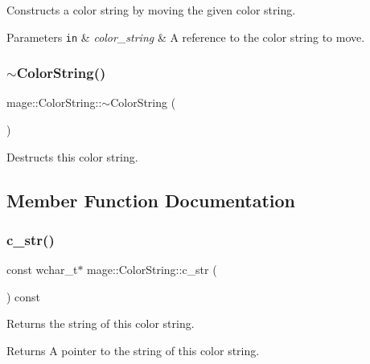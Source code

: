 Constructs a color string by moving the given color string.


\begin{DoxyParams}[1]{Parameters}
\mbox{\tt in}  & {\em color\+\_\+string} & A reference to the color string to move. \\
\hline
\end{DoxyParams}
\hypertarget{structmage_1_1_color_string_a95886010269c8c4bc3a27fbfe829f4c2}{}\label{structmage_1_1_color_string_a95886010269c8c4bc3a27fbfe829f4c2} 
\subsubsection{\texorpdfstring{$\sim$\+Color\+String()}{~ColorString()}}
{\footnotesize\ttfamily mage\+::\+Color\+String\+::$\sim$\+Color\+String (\begin{DoxyParamCaption}{ }\end{DoxyParamCaption})\hspace{0.3cm}{\ttfamily [default]}}

Destructs this color string. 

\subsection{Member Function Documentation}
\hypertarget{structmage_1_1_color_string_af2241b81cac59051e9ebf0ddefe719ed}{}\label{structmage_1_1_color_string_af2241b81cac59051e9ebf0ddefe719ed} 
\subsubsection{\texorpdfstring{c\+\_\+str()}{c\_str()}}
{\footnotesize\ttfamily const wchar\+\_\+t$\ast$ mage\+::\+Color\+String\+::c\+\_\+str (\begin{DoxyParamCaption}{ }\end{DoxyParamCaption}) const\hspace{0.3cm}{\ttfamily [noexcept]}}

Returns the string of this color string.

\begin{DoxyReturn}{Returns}
A pointer to the string of this color string. 
\end{DoxyReturn}
\hypertarget{structmage_1_1_color_string_afba86162d9c13d76dcdb9cf232e8e89f}{}\label{structmage_1_1_color_string_afba86162d9c13d76dcdb9cf232e8e89f} 
